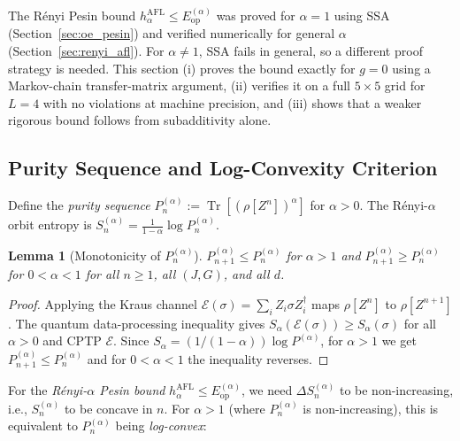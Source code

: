 \documentclass[12pt,a4paper]{article}
\newtheorem{lemma}[theorem]{Lemma}
\begin{document}
The Rényi Pesin bound $h_\alpha^{\mathrm{AFL}}\leq E_{\mathrm{op}}^{(\alpha)}$ was proved for $\alpha=1$
using SSA (Section~\ref{sec:oe_pesin}) and verified numerically for general $\alpha$ (Section~\ref{sec:renyi_afl}).
For $\alpha\neq 1$, SSA fails in general, so a different proof strategy is needed.
This section (i) proves the bound exactly for $g=0$ using a Markov-chain transfer-matrix argument,
(ii) verifies it on a full $5\times 5$ grid for $L=4$ with no violations at machine precision,
and (iii) shows that a weaker rigorous bound follows from subadditivity alone.

\subsection{Purity Sequence and Log-Convexity Criterion}
\label{subsec:purity_seq}

Define the \emph{purity sequence} $P_n^{(\alpha)} := \operatorname{Tr}[(\rho[Z^n])^\alpha]$ for $\alpha>0$.
The Rényi-$\alpha$ orbit entropy is $S_n^{(\alpha)} = \frac{1}{1-\alpha}\log P_n^{(\alpha)}$.

\begin{lemma}[Monotonicity of $P_n^{(\alpha)}$]
\label{lem:purity_monotone}
$P_{n+1}^{(\alpha)}\leq P_n^{(\alpha)}$ for $\alpha>1$ and $P_{n+1}^{(\alpha)}\geq P_n^{(\alpha)}$ for $0<\alpha<1$
for all $n\geq 1$, all $(J,G)$, and all $d$.
\end{lemma}

\begin{proof}
Applying the Kraus channel $\mathcal{E}(\sigma)=\sum_i Z_i \sigma Z_i^\dagger$ maps
$\rho[Z^n]$ to $\rho[Z^{n+1}]$. The quantum data-processing inequality gives
$S_\alpha(\mathcal{E}(\sigma))\geq S_\alpha(\sigma)$ for all $\alpha>0$ and CPTP $\mathcal{E}$.
Since $S_\alpha=(1/(1-\alpha))\log P^{(\alpha)}$, for $\alpha>1$ we get $P^{(\alpha)}_{n+1}\leq P^{(\alpha)}_n$
and for $0<\alpha<1$ the inequality reverses.
\end{proof}

For the \emph{Rényi-$\alpha$ Pesin bound} $h_\alpha^{\mathrm{AFL}}\leq E_{\mathrm{op}}^{(\alpha)}$,
we need $\Delta S_n^{(\alpha)}$ to be non-increasing, i.e., $S_n^{(\alpha)}$ to be concave in $n$.
For $\alpha>1$ (where $P^{(\alpha)}_n$ is non-increasing), this is equivalent to
$P_n^{(\alpha)}$ being \emph{log-convex}:
\end{document}
